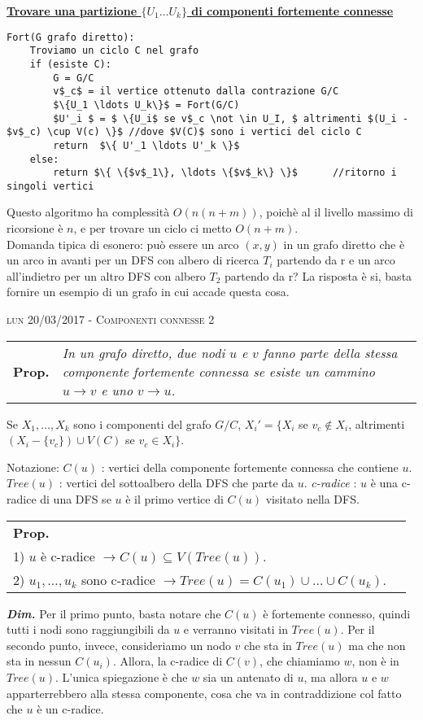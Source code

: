 \documentclass[a4paper,10pt]{article} %
\newcommand{\dimo}[1]{%
    \smallbreak \par \hfill\begin{minipage}{0.92\linewidth}{ \scriptsize {\textbf{\em{Dim.}}} {#1} }\end{minipage} \smallskip \par}
\newcommand{\malgorithm}[1]{%
    {\bigbreak \par \hspace*{4pt} \underline{\textbf {#1}}}}
\newcommand{\msection}[1]{%
    {\newpage\bigbreak \bigbreak \par \hfil \huge \textsc {#1}}\par}
\newcommand{\mprop}[1]{%
    {\smallbreak\par\begin{tabular}{ll} \textbf{Prop.} & \begin{minipage}[t]{0.8\columnwidth}\emph  {#1}\end{minipage}\tabularnewline \end{tabular}}\smallskip\par}
\begin{document}
\malgorithm{Trovare una partizione $\{U_1 \ldots U_k\}$ di componenti fortemente connesse}
\begin{lstlisting}
Fort(G grafo diretto):
    Troviamo un ciclo C nel grafo
    if (esiste C):
        G = G/C
        v$_c$ = il vertice ottenuto dalla contrazione G/C
        $\{U_1 \ldots U_k\}$ = Fort(G/C)
        $U'_i $ = $ \{U_i$ se v$_c \not \in U_I, $ altrimenti $(U_i - $v$_c) \cup V(c) \}$ //dove $V(C)$ sono i vertici del ciclo C
        return  $\{ U'_1 \ldots U'_k \}$
    else:
        return $\{ \{$v$_1\}, \ldots \{$v$_k\} \}$      //ritorno i singoli vertici
\end{lstlisting}
Questo algoritmo ha complessità $O(n(n + m))$, poichè al il livello massimo di ricorsione è $n$, e per trovare un ciclo ci metto $O(n + m)$.
\\[3ex]
Domanda tipica di esonero: può essere un arco $(x, y)$ in un grafo diretto che è un arco in avanti per un DFS con albero di ricerca $T_i$ partendo da r e un arco all'indietro per un altro DFS con albero $T_2$ partendo da r? La risposta è si, basta fornire un esempio di un grafo in cui accade questa cosa.





\msection{lun 20/03/2017 - Componenti connesse 2}




\mprop{In un grafo diretto, due nodi $u$ e $v$ fanno parte della stessa componente fortemente connessa se esiste un cammino $u \rightarrow v$ e uno $v \rightarrow u$.}

Se $X_1, \ldots , X_k$ sono i componenti del grafo $G/C$, $X_i' = \{ X_i $ se $v_c \not \in X_i$, altrimenti $(X_i - \{v_c\}) \cup V(C) $ se $v_c \in X_i \}$.

Notazione: $C(u)$ : vertici della componente fortemente connessa che contiene $u$.
           $Tree(u)$ : vertici del sottoalbero della DFS che parte da $u$.
           \emph{c-radice} : $u$ è una c-radice di una DFS se $u$ è il primo vertice di $C(u)$ visitato nella DFS.


\mprop{Sia $T$ l'albero di visita di una DFS. Allora: \\ 1) $u$ è c-radice $\rightarrow C(u) \subseteq V(Tree(u))$.  \\ 2) $u_1, \ldots, u_k$ sono c-radice $\rightarrow Tree(u) = C(u_1) \cup \ldots \cup C(u_k)$.}
\dimo{Per il primo punto, basta notare che $C(u)$ è fortemente connesso, quindi tutti i nodi sono raggiungibili da $u$ e verranno visitati in $Tree(u)$. Per il secondo punto, invece, consideriamo un nodo $v$ che sta in $Tree(u)$ ma che non sta in nessun $C(u_i)$. Allora, la c-radice di $C(v)$, che chiamiamo $w$, non è in $Tree(u)$. L'unica spiegazione è che $w$ sia un antenato di $u$, ma allora $u$ e $w$ apparterrebbero alla stessa componente, cosa che va in contraddizione col fatto che $u$ è un c-radice.}
\end{document}
